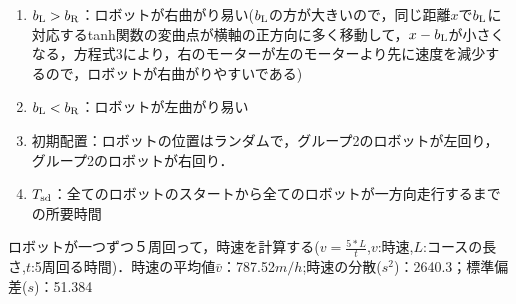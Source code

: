\begin{enumerate}
\item $b_{\rm L}>b_{\rm R}$：ロボットが右曲がり易い($b_{\rm L}$の方が大きいので，同じ距離$x$で$b_{\rm L}$に対応するtanh関数の変曲点が横軸の正方向に多く移動して，$x-b_{\rm L}$が小さくなる，方程式3により，右のモーターが左のモーターより先に速度を減少するので，ロボットが右曲がりやすいである)
\item $b_{\rm L}<b_{\rm R}$：ロボットが左曲がり易い
\item 初期配置：ロボットの位置はランダムで，グループ2のロボットが左回り，グループ2のロボットが右回り．
\item $T_{\rm sd}$：全てのロボットのスタートから全てのロボットが一方向走行するまでの所要時間
\end{enumerate}


ロボットが一つずつ５周回って，時速を計算する($v=\frac{5*L}{t}$,$v$:時速,$L$:コースの長さ,$t$:5周回る時間)．時速の平均値$\bar v$：787.52$m/h$;時速の分散($s^2$)：2640.3；標準偏差($s$)：51.384


